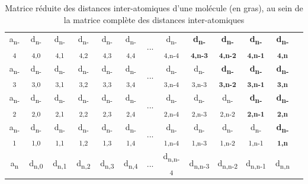 \begin{table}
\begin{tabular}{c|c|c|c|c|c|c|c|c|c|c|c|c}
		\rot{... } & \rot{... } & \rot{... } & \rot{... } & \rot{... } & 
		\rot{... } & \halfrot{ ... } & \rot{... } & \rot{... } & \rot{... } & 
		\rot{... } & \rot{... } \\ \hline
	    	
	    	
		a\textsubscript{n-4} & d\textsubscript{n-4,0} & d\textsubscript{n-4,1} & d\textsubscript{n-4,2} & 
			d\textsubscript{n-4,3} & d\textsubscript{n-4,4} & ... & d\textsubscript{n-4,n-4} & 
			\textbf{d\textsubscript{n-4,n-3}} & \textbf{d\textsubscript{n-4,n-2}} & \textbf{d\textsubscript{n-4,n-1}} & 
			\textbf{d\textsubscript{n-4,n}} \\ \hline	    
		a\textsubscript{n-3} & d\textsubscript{n-3,0} & d\textsubscript{n-3,1} & d\textsubscript{n-3,2} & 
			d\textsubscript{n-3,3} & d\textsubscript{n-3,4} & ... & d\textsubscript{n-3,n-4} & 
			d\textsubscript{n-3,n-3} & \textbf{d\textsubscript{n-3,n-2}} & \textbf{d\textsubscript{n-3,n-1}} & 
			\textbf{d\textsubscript{n-3,n}} \\ \hline
		a\textsubscript{n-2} & d\textsubscript{n-2,0} & d\textsubscript{n-2,1} & d\textsubscript{n-2,2} & 
			d\textsubscript{n-2,3} & d\textsubscript{n-2,4} & ... & d\textsubscript{n-2,n-4} & 
			d\textsubscript{n-2,n-3} & d\textsubscript{n-2,n-2} & \textbf{d\textsubscript{n-2,n-1}} & 
			\textbf{d\textsubscript{n-2,n}} \\ \hline
		a\textsubscript{n-1} & d\textsubscript{n-1,0} & d\textsubscript{n-1,1} & d\textsubscript{n-1,2} & 
			d\textsubscript{n-1,3} & d\textsubscript{n-1,4} & ... & d\textsubscript{n-1,n-4} & 
			d\textsubscript{n-1,n-3} & d\textsubscript{n-1,n-2} & d\textsubscript{n-1,n-1} & 
			\textbf{d\textsubscript{n-1,n}} \\ \hline
		a\textsubscript{n} & d\textsubscript{n,0} & d\textsubscript{n,1} & d\textsubscript{n,2} & 
			d\textsubscript{n,3} & d\textsubscript{n,4} & ... & d\textsubscript{n,n-4} & 
			d\textsubscript{n,n-3} & d\textsubscript{n,n-2} & d\textsubscript{n,n-1} & d\textsubscript{n,n} \\ \hline
		
	\end{tabular}

	
	\caption{Matrice réduite des distances inter-atomiques d'une molécule (en gras), au sein de la matrice complète des distances inter-atomiques}
	\label{table_mat_interat_1}

\end{table}

